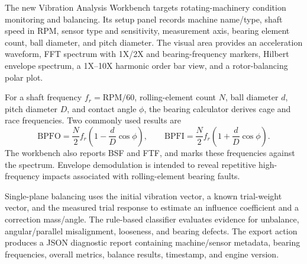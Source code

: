 \documentclass[10pt,a4paper]{article}
\begin{document}
The new Vibration Analysis Workbench targets rotating-machinery condition monitoring and balancing. Its setup panel records machine name/type, shaft speed in RPM, sensor type and sensitivity, measurement axis, bearing element count, ball diameter, and pitch diameter. The visual area provides an acceleration waveform, FFT spectrum with 1X/2X and bearing-frequency markers, Hilbert envelope spectrum, a 1X--10X harmonic order bar view, and a rotor-balancing polar plot.

\begin{center}
\end{center}

For a shaft frequency $f_r=\mathrm{RPM}/60$, rolling-element count $N$, ball diameter $d$, pitch diameter $D$, and contact angle $\phi$, the bearing calculator derives cage and race frequencies. Two commonly used results are
\[
 \mathrm{BPFO}=\frac{N}{2}f_r\left(1-\frac{d}{D}\cos\phi\right),\qquad
 \mathrm{BPFI}=\frac{N}{2}f_r\left(1+\frac{d}{D}\cos\phi\right).
\]
The workbench also reports BSF and FTF, and marks these frequencies against the spectrum. Envelope demodulation is intended to reveal repetitive high-frequency impacts associated with rolling-element bearing faults.

Single-plane balancing uses the initial vibration vector, a known trial-weight vector, and the measured trial response to estimate an influence coefficient and a correction mass/angle. The rule-based classifier evaluates evidence for unbalance, angular/parallel misalignment, looseness, and bearing defects. The export action produces a JSON diagnostic report containing machine/sensor metadata, bearing frequencies, overall metrics, balance results, timestamp, and engine version.
\end{document}
